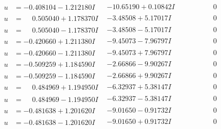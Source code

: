 \documentclass[1p]{elsarticle_modified}
\theoremstyle{definition}
\begin{document}
$$\begin{array}{c|c|c}
\begin{aligned}
u &= -0.408104 - 1.212180 I\end{aligned}
 & -10.65190 + 0.10842 I & \phantom{-0.000000 } 0 \\ \hline\begin{aligned}
u &= \phantom{-}0.505040 + 1.178370 I\end{aligned}
 & -3.48508 + 5.17017 I & \phantom{-0.000000 } 0 \\ \hline\begin{aligned}
u &= \phantom{-}0.505040 - 1.178370 I\end{aligned}
 & -3.48508 - 5.17017 I & \phantom{-0.000000 } 0 \\ \hline\begin{aligned}
u &= -0.420660 + 1.211380 I\end{aligned}
 & -9.45073 - 7.96797 I & \phantom{-0.000000 } 0 \\ \hline\begin{aligned}
u &= -0.420660 - 1.211380 I\end{aligned}
 & -9.45073 + 7.96797 I & \phantom{-0.000000 } 0 \\ \hline\begin{aligned}
u &= -0.509259 + 1.184590 I\end{aligned}
 & -2.66866 - 9.90267 I & \phantom{-0.000000 } 0 \\ \hline\begin{aligned}
u &= -0.509259 - 1.184590 I\end{aligned}
 & -2.66866 + 9.90267 I & \phantom{-0.000000 } 0 \\ \hline\begin{aligned}
u &= \phantom{-}0.484969 + 1.194950 I\end{aligned}
 & -6.32937 + 5.38147 I & \phantom{-0.000000 } 0 \\ \hline\begin{aligned}
u &= \phantom{-}0.484969 - 1.194950 I\end{aligned}
 & -6.32937 - 5.38147 I & \phantom{-0.000000 } 0 \\ \hline\begin{aligned}
u &= -0.481638 + 1.201620 I\end{aligned}
 & -9.01650 - 0.91732 I & \phantom{-0.000000 } 0 \\ \hline\begin{aligned}
u &= -0.481638 - 1.201620 I\end{aligned}
 & -9.01650 + 0.91732 I & \phantom{-0.000000 } 0 \\ \hline\begin{aligned}

\end{aligned}
\end{array}$$
\end{document}
